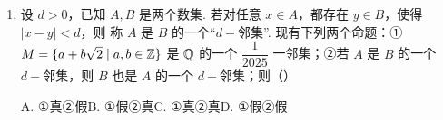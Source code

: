 \documentclass[a4paper,11pt]{article}
\begin{document}
\begin{enumerate}
\item 设 $d>0$，已知 $A,B$ 是两个数集. 若对任意 $x\in A$，都存在 $y\in B$，使得 $\lvert x-y\rvert<d$，则
称 $A$ 是 $B$ 的一个“$d-$邻集”. 现有下列两个命题：① $M=\{a+b\sqrt2\mid a,b\in\mathbb{Z}\}$ 是 $\mathbb{Q}$ 的一个
$\dfrac1{2025}$
一邻集；②若 $A$ 是 $B$ 的一个 $d-$邻集，则 $B$ 也是 $A$ 的一个 $d-$邻集；则\mbox{（\quad）}%

\keepwithprev
A. ①真②假\qquad B. ①假②真\qquad C. ①真②真\qquad D. ①假②假

\ifanswer
\solbegin
{}
\solend
\fi

\end{enumerate}

\end{document}

